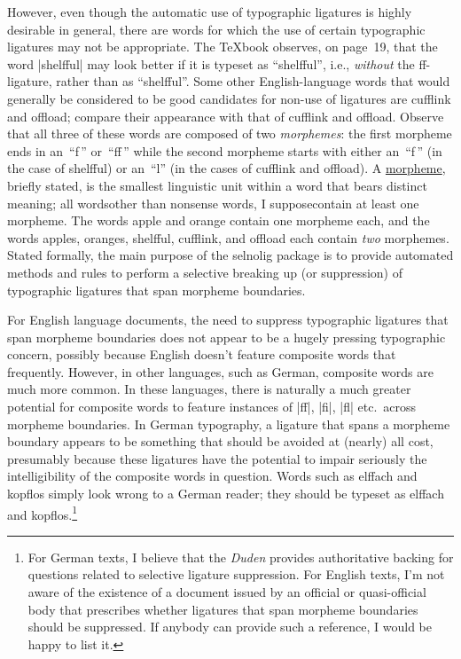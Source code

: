 \documentclass[11pt]{article}
\newcommand{\pkg}[1]{\textsf{#1}}
\begin{document}
However, even though the automatic use of typographic ligatures is highly desirable in general, there are words for which the use of certain typographic ligatures may not be appropriate. The \TeX book observes, on page~19, that the word |shelfful| may look better if it is typeset as \enquote{shelfful}, i.e., \emph{without} the ff-ligature, rather than as \enquote{\mbox{shelfful}}. Some other English-language words that would generally be considered to be good candidates for non-use of ligatures are \mbox{cufflink} and \mbox{offload}; compare their appearance with that of cufflink and offload. Observe that all three of these words are composed of two \emph{morphemes}: the first morpheme ends in an~\enquote{f\,} or~\enquote{ff\,} while the second morpheme starts with either an~\enquote{f\,} (in the case of shelfful) or an~\enquote{l} (in the cases of cufflink and offload). A \href{http://en.wikipedia.org/wiki/Morpheme}{morpheme}, briefly stated, is the smallest linguistic unit within a word that bears distinct meaning; all words\textemdash other than nonsense words, I suppose\textemdash contain at least one morpheme. The words apple and orange contain one morpheme each, and the words apples, oranges, shelfful, cufflink, and offload each contain \emph{two} morphemes. Stated formally, the main purpose of the \pkg{selnolig} package is to provide automated methods and rules to perform a selective breaking up (or suppression) of typographic ligatures that span morpheme boundaries.

For English language documents, the need to suppress typographic ligatures that span morpheme boundaries does not appear to be a hugely pressing typographic concern, possibly because English doesn't feature composite words that frequently. However, in other languages, such as German, composite words are much more common. In these languages, there is naturally a much greater potential for composite words to feature instances of |ff|, |fi|, |fl| etc.\ across morpheme boundaries. In German typography, a ligature that spans a morpheme boundary appears to be something that should be avoided at (nearly) all cost, presumably because these ligatures have the potential to impair seriously the intelligibility of the composite words in question. Words such as \mbox{elffach} and \mbox{kopflos} simply look wrong to a German reader; they should be typeset as elffach and kopflos.\footnote{For German texts, I believe that the \emph{Duden} provides authoritative backing for questions related to selective ligature suppression. For English texts, I'm not aware of the existence of a document issued by an official or quasi-official body that prescribes whether ligatures that span morpheme boundaries should be suppressed. If anybody can provide such a reference, I would be happy to list it.}
\end{document}
